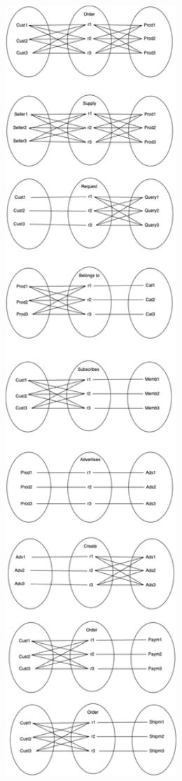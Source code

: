 \documentclass[
  letterpaper,
  DIV=11,
  numbers=noendperiod]{scrartcl}
\begin{document}
\includegraphics[width=4.79167in,height=\textheight]{relationship_set.png}
\end{document}
